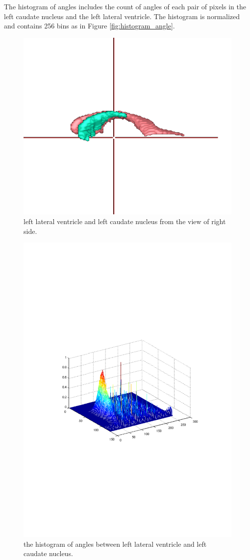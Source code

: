 \documentclass{article}
\begin{document}
The histogram of angles includes the count of angles of each pair of pixels in the left caudate nucleus and the left lateral ventricle.
The histogram is normalized and contains 256 bins as in Figure \ref{fig:histogram_angle}.


\begin{figure}[h]
 \centering
 \includegraphics[width=.3\textwidth]{./figures/right_lvl_cdl.png}
 \caption{\label{fig:sturctpair}left lateral ventricle and left caudate nucleus from the view of right side.}
\end{figure}
\begin{figure}[h]
 \centering
 \includegraphics[width=.5\textwidth]{./figures/right_cdl_lvl.pdf}
 \caption{\label{fig:histopair}the histogram of angles between left lateral ventricle and left caudate nucleus.}
\end{figure}
\end{document}
